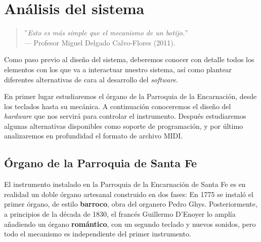 
\chapter{Análisis del sistema}
\label{cap:capitulo_3}

\begin{quote}
	\small \flushright ''\textit{Esto es más simple que el mecanismo de un botijo.}'' \\
	--- Profesor Miguel Delgado Calvo-Flores (2011).
\end{quote}

\vspace{8em}

Como paso previo al diseño del sistema, deberemos conocer con detalle todos los elementos con los que va a interactuar nuestro sistema, así como plantear diferentes alternativas de cara al desarrollo del \textit{software}.

En primer lugar estudiaremos el órgano de la Parroquia de la Encarnación, desde los teclados hasta su mecánica. A continuación conoceremos el diseño del \textit{hardware} que nos servirá para controlar el instrumento. Después estudiaremos algunas alternativas disponibles como soporte de programación, y por último analizaremos en profundidad el formato de archivo \acrshort{MIDI}.

\newpage

\section{Órgano de la Parroquia de Santa Fe}

El instrumento instalado en la Parroquia de la Encarnación de Santa Fe es en realidad un doble órgano artesanal construido en dos fases: En 1775 se instaló el primer órgano, de estilo \textbf{barroco}, obra del organero Pedro Ghys. Posteriormente, a principios de la década de 1830, el francés Guillermo D'Enoyer lo amplía añadiendo un órgano \textbf{romántico}, con un segundo teclado y nuevos sonidos, pero todo el mecanismo es independiente del primer instrumento.

\smallskip

